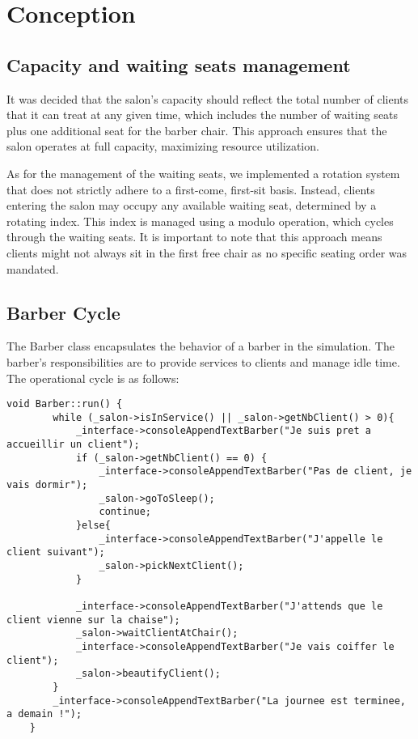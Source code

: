 \documentclass{article}
\begin{document}
    \section{Conception}

    \subsection{Capacity and waiting seats management}

    It was decided that the salon's capacity should reflect the total number of clients that it can treat at any given time, which includes the number of waiting seats plus one additional seat for the barber chair.
    This approach ensures that the salon operates at full capacity, maximizing resource utilization.

    As for the management of the waiting seats, we implemented a rotation system that does not strictly adhere to a first-come, first-sit basis.
    Instead, clients entering the salon may occupy any available waiting seat, determined by a rotating index.
    This index is managed using a modulo operation, which cycles through the waiting seats.
    It is important to note that this approach means clients might not always sit in the first free chair as no specific seating order was mandated.

    \subsection{Barber Cycle}

    The Barber class encapsulates the behavior of a barber in the simulation.
    The barber's responsibilities are to provide services to clients and manage idle time.
    The operational cycle is as follows:

    \begin{lstlisting}[caption={The barber operational cycle}, captionpos=b, label=lst:1]
    void Barber::run() {
        while (_salon->isInService() || _salon->getNbClient() > 0){
            _interface->consoleAppendTextBarber("Je suis pret a accueillir un client");
            if (_salon->getNbClient() == 0) {
                _interface->consoleAppendTextBarber("Pas de client, je vais dormir");
                _salon->goToSleep();
                continue;
            }else{
                _interface->consoleAppendTextBarber("J'appelle le client suivant");
                _salon->pickNextClient();
            }

            _interface->consoleAppendTextBarber("J'attends que le client vienne sur la chaise");
            _salon->waitClientAtChair();
            _interface->consoleAppendTextBarber("Je vais coiffer le client");
            _salon->beautifyClient();
        }
        _interface->consoleAppendTextBarber("La journee est terminee, a demain !");
    }
    \end{lstlisting}
\end{document}
